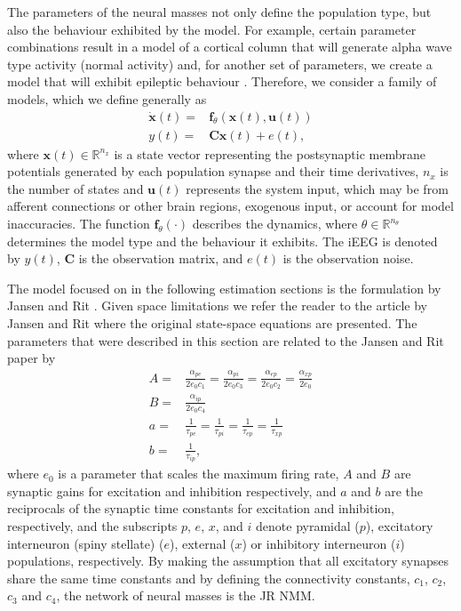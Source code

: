 \documentclass{article}
\renewcommand{\vec}[1]{\ensuremath{{\boldsymbol #1}}}
\newcommand{\mat}[1]{\ensuremath{\boldsymbol{#1}}}
\begin{document}
The parameters of the neural masses not only define the population type, but also the behaviour exhibited by the model. For example, certain parameter combinations result in a model of a cortical column that will generate alpha wave type activity (normal activity) and, for another set of parameters, we create a model that will exhibit epileptic behaviour \cite{Wendling2002}. Therefore, we consider a family of models, which we define generally as 
\begin{align}\label{eq:NeuralMassModel}
    \dot{\vec{x}}(t) =& \vec f_{\theta}\left(\vec{x}(t),\vec{u}(t)\right)\\
    y(t) =& \mat{C}\vec{x}(t) + e(t),
\end{align}
where $\vec{x}(t) \in \mathbb{R}^{n_x}$ is a state vector representing the postsynaptic membrane potentials generated by each population synapse and their time derivatives, $n_x$ is the number of states and $\vec{u}(t)$ represents the system input, which may be from afferent connections or other brain regions, exogenous input, or account for model inaccuracies. The function $\vec f_{\theta}(\cdot)$ describes the dynamics, where $\theta \in \mathbb{R}^{n_{\theta}}$ determines the model type and the behaviour it exhibits. The iEEG is denoted by $y(t)$, $\vec{C}$ is the observation matrix, and $e(t)$ is the observation noise.

The model focused on in the following
estimation sections is the formulation by Jansen and Rit \cite{Jansen-Rit-95}.
Given space limitations we refer the reader to the article by Jansen
and Rit\cite{Jansen-Rit-95} where the original state-space equations
are presented. The parameters that were described in this section are related to the Jansen and Rit paper by
\begin{align}
    A =& \frac{\alpha_{pe}}{2e_0c_1} = \frac{\alpha_{pi}}{2e_0c_3} = \frac{\alpha_{ep}}{2e_0c_2} = \frac{\alpha_{xp}}{2e_0} \\
    B =& \frac{\alpha_{ip}}{2e_0c_4} \\
    a =& \frac{1}{\tau_{pe}} = \frac{1}{\tau_{pi}} = \frac{1}{\tau_{ep}} = \frac{1}{\tau_{xp}} \\
    b =& \frac{1}{\tau_{ip}},
\end{align}
where $e_0$ is a parameter that scales the maximum firing rate, $A$ and $B$ are synaptic gains for excitation and inhibition respectively, and $a$ and $b$ are the reciprocals of the synaptic time constants for excitation and inhibition, respectively, and the subscripts $p$, $e$, $x$, and $i$ denote pyramidal ($p$), excitatory interneuron (spiny stellate) ($e$), external ($x$) or inhibitory interneuron ($i$) populations, respectively. By making the assumption that all excitatory synapses share the same time constants and by defining the connectivity constants, $c_1$, $c_2$, $c_3$ and $c_4$, the network of neural masses is the JR NMM.
\end{document}
